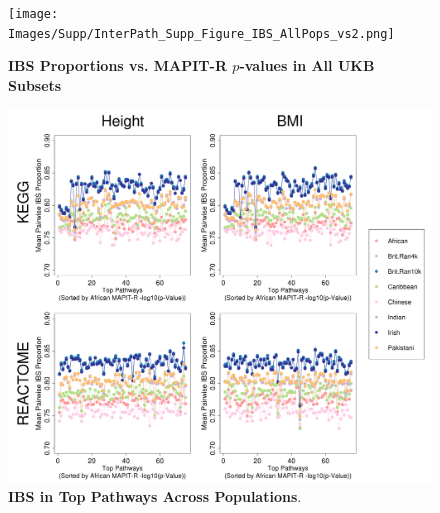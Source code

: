 \documentclass[12pt, a4paper]{article}
\begin{document}

\begin{figure}[htbp]
\centering
\texttt{[image: Images/Supp/InterPath\_Supp\_Figure\_IBS\_AllPops\_vs2.png]}
\caption[TBD]{\textbf{IBS Proportions vs. MAPIT-R $p$-values in All UKB Subsets}}
\label{InterPath-Supp-Figure-IBS-AllPops}
\end{figure}
\clearpage

\begin{figure}[htbp]
\centering
\includegraphics[scale=.35]{Images/Supp/InterPath_Supp_Figure_IBS_AllPopComps_vs2.png}
\caption[TBD]{\textbf{IBS in Top Pathways Across Populations}.}
\label{InterPath-Supp-Figure-IBS-AllPopComps}
\end{figure}
\clearpage
\end{document}
